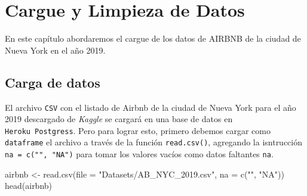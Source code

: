 \documentclass[
]{book}
\newenvironment{Shaded}{\begin{snugshade}}{\end{snugshade}}
\newcommand{\AttributeTok}[1]{\textcolor[rgb]{0.77,0.63,0.00}{#1}}
\newcommand{\FunctionTok}[1]{\textcolor[rgb]{0.00,0.00,0.00}{#1}}
\newcommand{\NormalTok}[1]{#1}
\newcommand{\OtherTok}[1]{\textcolor[rgb]{0.56,0.35,0.01}{#1}}
\newcommand{\StringTok}[1]{\textcolor[rgb]{0.31,0.60,0.02}{#1}}
\begin{document}
\hypertarget{cargue-y-limpieza-de-datos}{%
\chapter{Cargue y Limpieza de Datos}\label{cargue-y-limpieza-de-datos}}

En este capítulo abordaremos el cargue de los datos de AIRBNB de la ciudad de Nueva York en el año 2019.

\hypertarget{carga-de-datos}{%
\section{Carga de datos}\label{carga-de-datos}}

El archivo \texttt{CSV} con el listado de Airbnb de la ciudad de Nueva York para el año 2019 descargado de \emph{Kaggle} se cargará en una base de datos en \texttt{Heroku\ Postgress}. Pero para lograr esto, primero debemos cargar como \texttt{dataframe} el archivo a través de la función \texttt{read.csv()}, agregando la isntrucción \texttt{na\ =\ c("",\ "NA")} para tomar los valores vacíos como datos faltantes \texttt{na}.

\begin{Shaded}
\begin{Highlighting}[]
\NormalTok{airbnb }\OtherTok{\textless{}{-}} \FunctionTok{read.csv}\NormalTok{(}\AttributeTok{file =} \StringTok{"Datasets/AB\_NYC\_2019.csv"}\NormalTok{, }\AttributeTok{na =} \FunctionTok{c}\NormalTok{(}\StringTok{""}\NormalTok{, }\StringTok{"NA"}\NormalTok{))}
\FunctionTok{head}\NormalTok{(airbnb)}
\end{Highlighting}
\end{Shaded}
\end{document}
